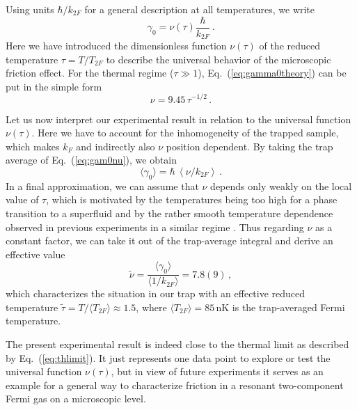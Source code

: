 Using units $\hbar / k_{2F}$ for a general description at all temperatures, we write
\begin{equation}
\gamma_0 = \nu(\tau) \frac{\hbar}{k_{2F}} \, .
\label{eq:gam0nu}
\end{equation}
Here we have introduced the dimensionless function $\nu(\tau)$ of the reduced temperature $\tau = T/T_{2F}$ to describe the universal behavior of the microscopic friction effect.
For the thermal regime ($\tau\gg 1$),  Eq.~(\ref{eq:gamma0theory}) can be put in the simple form
\begin{equation}
\nu = 9.45 \,\tau^{-1/2} \, .
\label{eq:thlimit}
\end{equation}

Let us now interpret our experimental result in relation to the universal function $\nu(\tau)$. Here we have to account for the inhomogeneity of the trapped sample, which makes $k_F$ and indirectly also $\nu$ position dependent. By taking the trap average of Eq.~(\ref{eq:gam0nu}), we obtain
\begin{equation}
\langle{\gamma}_0\rangle = 
\hbar \, 
\left\langle \nu / k_{2F} \right\rangle \, .
\end{equation}
In a final approximation, we can assume that $\nu$ depends only weakly on the local value of $\tau$, which is motivated by the temperatures being too high for a phase transition to a superfluid  \cite{Pini2021bmf} and by the rather smooth temperature dependence observed in previous experiments in a similar regime \cite{Sommer2011ust, Valtolina2017etf}. %
Thus regarding $\nu$ as a constant factor, we can take it out of the trap-average integral and derive an effective value
\begin{equation}
\tilde{\nu} = \frac{\langle \gamma_0 \rangle}{\langle 1/k_{2F} \rangle} = 7.8(9) 
\, ,
\label{eq:nueff}
\end{equation}
which characterizes the situation in our trap with an effective reduced temperature $\tilde{\tau} = T/\langle T_{2F} \rangle \approx 1.5$, where $\langle T_{2F} \rangle = 85\,$nK is the trap-averaged Fermi temperature.

The present experimental result is indeed close to the thermal limit as described by Eq.~(\ref{eq:thlimit}). It just 
represents one data point to explore or test the universal function $\nu(\tau)$, but in view of future experiments it serves as an example for a general way to characterize friction in a resonant two-component Fermi gas on a microscopic level.

